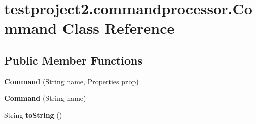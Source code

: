 \hypertarget{classtestproject2_1_1commandprocessor_1_1Command}{\section{testproject2.\-commandprocessor.\-Command Class Reference}
\label{classtestproject2_1_1commandprocessor_1_1Command}
}
\subsection*{Public Member Functions}
\begin{DoxyCompactItemize}
\item 
\hypertarget{classtestproject2_1_1commandprocessor_1_1Command_a6fc45f235b7f627e037ae0bd86595638}{{\bfseries Command} (String name, Properties prop)}\label{classtestproject2_1_1commandprocessor_1_1Command_a6fc45f235b7f627e037ae0bd86595638}

\item 
\hypertarget{classtestproject2_1_1commandprocessor_1_1Command_a8fd2cd7373b1fb004ab80f031aa8a1d4}{{\bfseries Command} (String name)}\label{classtestproject2_1_1commandprocessor_1_1Command_a8fd2cd7373b1fb004ab80f031aa8a1d4}

\item 
\hypertarget{classtestproject2_1_1commandprocessor_1_1Command_a19c732f9eacdfceacd6ef5dcad8c5972}{String {\bfseries to\-String} ()}\label{classtestproject2_1_1commandprocessor_1_1Command_a19c732f9eacdfceacd6ef5dcad8c5972}

\end{DoxyCompactItemize}
